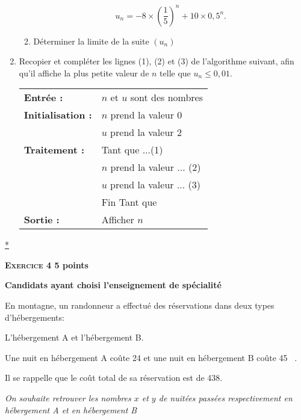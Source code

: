 \documentclass[10pt]{article}
\newcommand{\euro}{\eurologo{}}
\begin{document}
\begin{enumerate}
\begin{enumerate}
\[u_{n} = - 8 \times  \left(\dfrac{1}{5}\right)^n + 10 \times  0,5^n.\]
 
		\item Déterminer la limite de la suite $\left(u_{n}\right)$
	\end{enumerate} 
\item Recopier et compléter les lignes (1), (2) et (3) de l'algorithme suivant, afin qu'il affiche la plus petite valeur de $n$ telle que $u_{n} \leqslant  0,01$.
\begin{center}
\begin{tabularx}{0.6\linewidth}{|l X|} \hline
\textbf{Entrée :}& $n$ et $u$ sont des nombres\\ 
\textbf{Initialisation :}& $n$ prend la valeur 0\\
& $u$ prend la valeur 2\\  
\textbf{Traitement :}&Tant que ...\hfill (1)\\  
	&\hspace{0,5cm} $n$ prend la valeur ... 	\hfill(2)\\ 
	&\hspace{0,5cm} $u$ prend la valeur ... 	\hfill(3)\\ 
&Fin Tant que\\ 
\textbf{Sortie :}&Afficher $n$\\ \hline 
\end{tabularx}
\end{center}
\end{enumerate}

\hyperlink{Index}{*}

\vspace{0,5cm}

\textbf{\textsc{Exercice 4} \hfill 5 points}
 
\textbf{Candidats ayant  choisi l'enseignement de spécialité}

\medskip 

En montagne, un randonneur a effectué des réservations dans deux types d'hébergements:

L'hébergement A et l'hébergement B.

Une nuit en hébergement A coûte 24 \euro{} et une nuit en  hébergement B coûte 45 ~\euro{}.

Il se rappelle que le coût  total de sa réservation est de 438\euro{}.
 
\emph{On souhaite retrouver les nombres $x$ et $y$ de nuitées passées respectivement en hébergement A et en  hébergement B}
\end{document}
